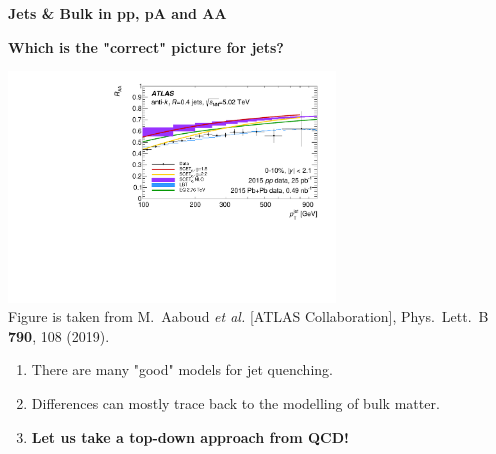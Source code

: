 \documentclass[9pt,a4paper,unknownkeysallowed,xcolor=dvipsnames,aspectratio=43]{beamer}
\begin{document}
{
\begin{frame}
%
\vspace{4mm}
\titlepage
\end{frame}
}
%
%
\setcounter{page}{0}
\begin{frame}
\vspace*{\fill}
\begin{center}
{\Huge\bf\color{gray} Jets \& Bulk in pp, pA and AA}
\end{center}
\vspace*{\fill}
\end{frame}
%
%
\begin{frame}{\bf\huge Which is the "correct" picture for jets?}	\vspace{4mm}
\begin{center}
\includegraphics[width=0.65\textwidth]{fig/RAA_jet}\\
{\tiny  Figure is taken from {\color{teablue}
M.~Aaboud {\it et al.} [ATLAS Collaboration],
  Phys.\ Lett.\ B {\bf 790}, 108 (2019).
  }}
\end{center}
\vspace{2mm}
\begin{enumerate}
\item{\large There are many "good" models for jet quenching.}
\vspace{4mm}
\item{\large Differences can mostly trace back to the modelling of  bulk matter.}
\vspace{4mm}
\item{\large\bf\color{darkred} Let us take a top-down approach from QCD!}
\end{enumerate}
\end{frame}
\end{document}
